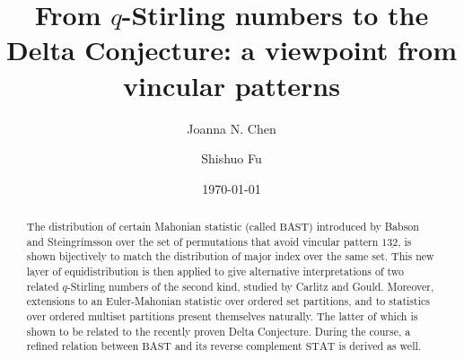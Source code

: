 \documentclass[12pt]{amsart}
\numberwithin{equation}{section}
\theoremstyle{plain}
\theoremstyle{definition}
\begin{document}
\title[From $q$-Stirling numbers to the Delta Conjecture]{From $q$-Stirling numbers to the Delta Conjecture: a viewpoint from vincular patterns
}

\author[J.~N.~Chen]{Joanna N. Chen}
\address{College of Science, Tianjin University of Technology, Tianjin 300384, P.R. China.}

\author[S.~Fu]{Shishuo Fu}
\address{College of Mathematics and Statistics, Chongqing University, Chongqing 401331, P.R. China.}

\date{\today}


\begin{abstract}
The distribution of certain Mahonian statistic (called $\mathrm{BAST}$) introduced by Babson and Steingr\'{i}msson over the set of permutations that avoid vincular pattern $1\underline{32}$, is shown bijectively to match the distribution of major index over the same set. This new layer of equidistribution is then applied to give alternative interpretations of two related $q$-Stirling numbers of the second kind, studied by Carlitz and Gould. Moreover, extensions to an Euler-Mahonian statistic over ordered set partitions, and to statistics over ordered multiset partitions present themselves naturally. The latter of which is shown to be related to the recently proven Delta Conjecture. During the course, a refined relation between $\mathrm{BAST}$ and its reverse complement $\mathrm{STAT}$ is derived as well.
\end{abstract}


\maketitle

\tableofcontents

\end{document}
